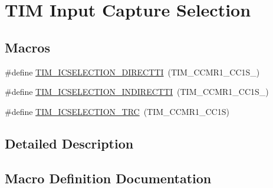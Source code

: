 \hypertarget{group___t_i_m___input___capture___selection}{}\section{T\+IM Input Capture Selection}
\label{group___t_i_m___input___capture___selection}
\subsection*{Macros}
\begin{DoxyCompactItemize}
\item 
\#define \hyperlink{group___t_i_m___input___capture___selection_gac3be2fd9c576e84e0ebcfc7b3c0773a3}{T\+I\+M\+\_\+\+I\+C\+S\+E\+L\+E\+C\+T\+I\+O\+N\+\_\+\+D\+I\+R\+E\+C\+T\+TI}~(T\+I\+M\+\_\+\+C\+C\+M\+R1\+\_\+\+C\+C1\+S\+\_)
\item 
\#define \hyperlink{group___t_i_m___input___capture___selection_gab9754d4318abcd7fe725e3ee2e4496d4}{T\+I\+M\+\_\+\+I\+C\+S\+E\+L\+E\+C\+T\+I\+O\+N\+\_\+\+I\+N\+D\+I\+R\+E\+C\+T\+TI}~(T\+I\+M\+\_\+\+C\+C\+M\+R1\+\_\+\+C\+C1\+S\+\_)
\item 
\#define \hyperlink{group___t_i_m___input___capture___selection_ga9e0191bbf1a82dd9150b9283c39276e7}{T\+I\+M\+\_\+\+I\+C\+S\+E\+L\+E\+C\+T\+I\+O\+N\+\_\+\+T\+RC}~(T\+I\+M\+\_\+\+C\+C\+M\+R1\+\_\+\+C\+C1S)
\end{DoxyCompactItemize}


\subsection{Detailed Description}


\subsection{Macro Definition Documentation}
\mbox{\label{group___t_i_m___input___capture___selection_gac3be2fd9c576e84e0ebcfc7b3c0773a3}} 
